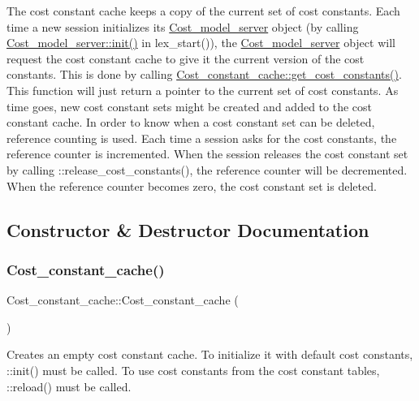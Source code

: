 The cost constant cache keeps a copy of the current set of cost constants. Each time a new session initializes its \mbox{\hyperlink{classCost__model__server}{Cost\+\_\+model\+\_\+server}} object (by calling \mbox{\hyperlink{classCost__model__server_a267c97e430cec8665c0c62ad722d80c1}{Cost\+\_\+model\+\_\+server\+::init()}} in lex\+\_\+start()), the \mbox{\hyperlink{classCost__model__server}{Cost\+\_\+model\+\_\+server}} object will request the cost constant cache to give it the current version of the cost constants. This is done by calling \mbox{\hyperlink{classCost__constant__cache_ade6946bec347063cbf5ad09cafbb97a0}{Cost\+\_\+constant\+\_\+cache\+::get\+\_\+cost\+\_\+constants()}}. This function will just return a pointer to the current set of cost constants. As time goes, new cost constant sets might be created and added to the cost constant cache. In order to know when a cost constant set can be deleted, reference counting is used. Each time a session asks for the cost constants, the reference counter is incremented. When the session releases the cost constant set by calling \+::release\+\_\+cost\+\_\+constants(), the reference counter will be decremented. When the reference counter becomes zero, the cost constant set is deleted. 

\subsection{Constructor \& Destructor Documentation}
\mbox{\label{classCost__constant__cache_aa428329188f6a76a121615419d4ef73f}} 
\subsubsection{\texorpdfstring{Cost\+\_\+constant\+\_\+cache()}{Cost\_constant\_cache()}}
{\footnotesize\ttfamily Cost\+\_\+constant\+\_\+cache\+::\+Cost\+\_\+constant\+\_\+cache (\begin{DoxyParamCaption}{ }\end{DoxyParamCaption})}

Creates an empty cost constant cache. To initialize it with default cost constants, \+::init() must be called. To use cost constants from the cost constant tables, \+::reload() must be called.


